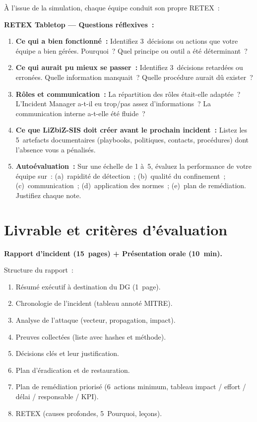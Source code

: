 À l'issue de la simulation, chaque équipe conduit son propre RETEX~:

\begin{boxexo}
\textbf{RETEX Tabletop — Questions réflexives~:}

\begin{enumerate}
  \item \textbf{Ce qui a bien fonctionné~:}
    Identifiez 3~décisions ou actions que votre équipe a bien gérées.
    Pourquoi~? Quel principe ou outil a été déterminant~?

  \item \textbf{Ce qui aurait pu mieux se passer~:}
    Identifiez 3~décisions retardées ou erronées. Quelle information
    manquait~? Quelle procédure aurait dû exister~?

  \item \textbf{Rôles et communication~:}
    La répartition des rôles était-elle adaptée~? L'Incident Manager
    a-t-il eu trop/pas assez d'informations~? La communication interne
    a-t-elle été fluide~?

  \item \textbf{Ce que LiZbiZ-SIS doit créer avant le prochain incident~:}
    Listez les 5~artefacts documentaires (playbooks, politiques,
    contacts, procédures) dont l'absence vous a pénalisés.

  \item \textbf{Autoévaluation~:}
    Sur une échelle de 1 à~5, évaluez la performance de votre équipe
    sur~: (a)~rapidité de détection~; (b)~qualité du confinement~;
    (c)~communication~; (d)~application des normes~;
    (e)~plan de remédiation. Justifiez chaque note.
\end{enumerate}
\end{boxexo}


\section{Livrable et critères d'évaluation}
\label{lab3:livrable}

\textbf{Rapport d'incident (15~pages) + Présentation orale (10~min).}

Structure du rapport~:
\begin{enumerate}
  \item Résumé exécutif à destination du DG (1~page).
  \item Chronologie de l'incident (tableau annoté MITRE).
  \item Analyse de l'attaque (vecteur, propagation, impact).
  \item Preuves collectées (liste avec hashes et méthode).
  \item Décisions clés et leur justification.
  \item Plan d'éradication et de restauration.
  \item Plan de remédiation priorisé (6~actions minimum, tableau
        impact / effort / délai / responsable / KPI).
  \item RETEX (causes profondes, 5~Pourquoi, leçons).
\end{enumerate}

